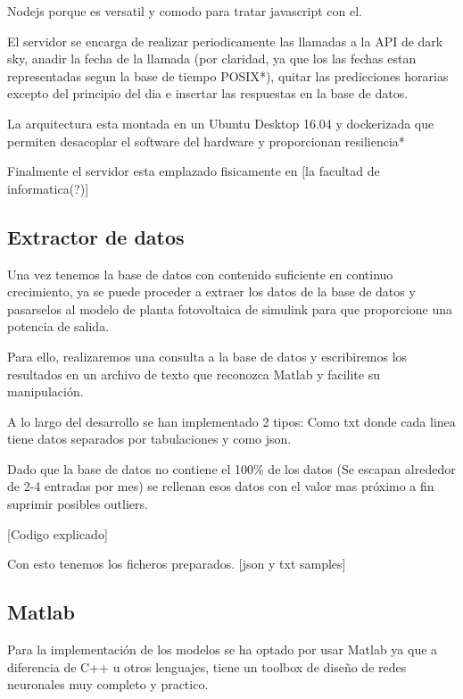 Nodejs porque es versatil y comodo para tratar javascript con el.

El servidor se encarga de realizar periodicamente las llamadas a la API de dark sky, anadir la fecha de la llamada (por claridad, ya que los las fechas estan representadas segun la base de tiempo POSIX*), quitar las predicciones horarias excepto del principio del dia e insertar las respuestas en la base de datos.

La arquitectura esta montada en un Ubuntu Desktop 16.04 y dockerizada que permiten desacoplar el software del hardware y proporcionan resiliencia*

Finalmente el servidor esta emplazado fisicamente en [la facultad de informatica(?)] 



\subsection{Extractor de datos} 
\label{sub:extractor_de_datos}

Una vez tenemos la base de datos con contenido suficiente en continuo crecimiento, ya se puede proceder a extraer los datos de la base de datos y pasarselos al modelo de planta fotovoltaica de simulink para que proporcione una potencia de salida.

Para ello, realizaremos una consulta a la base de datos y escribiremos los resultados en un archivo de texto que reconozca Matlab y facilite su manipulación.

A lo largo del desarrollo se han implementado 2 tipos: Como txt donde cada linea tiene datos separados por tabulaciones y como json.

Dado que la base de datos no contiene el 100\% de los datos (Se escapan alrededor de 2-4 entradas por mes) se rellenan esos datos con el valor mas próximo a fin suprimir posibles outliers.

[Codigo explicado]

Con esto tenemos los ficheros preparados.
[json y txt samples]



\subsection{Matlab}
\label{sub:Matlab} 

Para la implementación de los modelos se ha optado por usar Matlab ya que a diferencia de C++ u otros lenguajes, tiene un toolbox de diseño de redes neuronales muy completo y practico.

